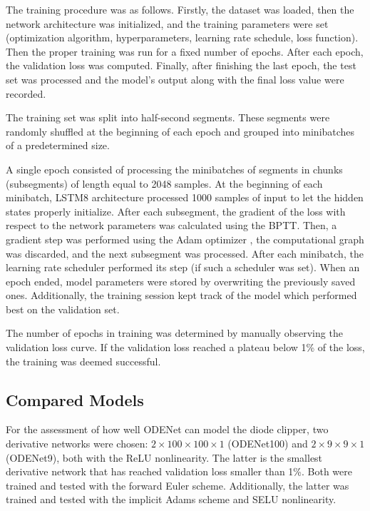 The training procedure was as follows. Firstly, the dataset was loaded, then the network architecture was initialized, and the training parameters were set (optimization algorithm, hyperparameters, learning rate schedule, loss function). Then the proper training was run for a fixed number of epochs. After each epoch, the validation loss was computed. Finally, after finishing the last epoch, the test set was processed and the model's output along with the final loss value were recorded.

The training set was split into half-second segments. These segments were randomly shuffled at the beginning of each epoch and grouped into minibatches of a predetermined size.

A single epoch consisted of processing the minibatches of segments in chunks (subsegments) of length equal to 2048 samples. At the beginning of each minibatch, \ac{LSTM}8 architecture processed 1000 samples of input to let the hidden states properly initialize. After each subsegment, the gradient of the loss with respect to the network parameters was calculated using the \ac{BPTT}. Then, a gradient step was performed using the Adam optimizer \cite{Kingma2017}, the computational graph was discarded, and the next subsegment was processed. After each minibatch, the learning rate scheduler performed its step (if such a scheduler was set). When an epoch ended, model parameters were stored by overwriting the previously saved ones. Additionally, the training session kept track of the model which performed best on the validation set.

The number of epochs in training was determined by manually observing the validation loss curve. If the validation loss reached a plateau below 1\% of the loss, the training was deemed successful.

\subsection{Compared Models}
\label{sec:diode_clipper_models}

For the assessment of how well ODENet can model the diode clipper, two derivative networks were chosen: $2 \times 100 \times 100 \times 1$ (ODENet100) and $2 \times 9 \times 9 \times 1$ (ODENet9), both with the \ac{ReLU} nonlinearity. The latter is the smallest derivative network that has reached validation loss smaller than 1\%. Both were trained and tested with the forward Euler scheme. Additionally, the latter was trained and tested with the implicit Adams scheme and \ac{SELU} nonlinearity.

